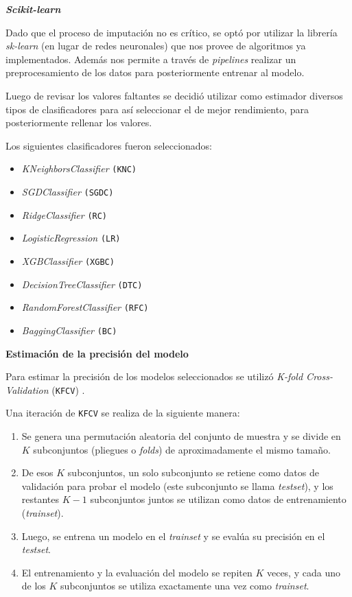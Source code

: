 \documentclass[a4paper,12pt]{article}
\begin{document}
		\clearpage
						
		\textbf{\textit{Scikit-learn}}
						
		Dado que el proceso de imputación no es crítico, se optó por utilizar la librería \textit{sk-learn} (en lugar de redes neuronales) que nos provee de algoritmos ya implementados. Además nos permite a través de \textit{pipelines} realizar un preprocesamiento de los datos para posteriormente entrenar al modelo.
						
		Luego de revisar los valores faltantes se decidió utilizar como estimador diversos tipos de clasificadores para así seleccionar el de mejor rendimiento, para posteriormente rellenar los valores.
						
		Los siguientes clasificadores fueron seleccionados:
						
		\begin{itemize}[noitemsep, topsep=2pt]
			\item \textit{KNeighborsClassifier} \texttt{(KNC)}
			\item \textit{SGDClassifier} \texttt{(SGDC)}
			\item \textit{RidgeClassifier} \texttt{(RC)}
			\item \textit{LogisticRegression} \texttt{(LR)}
			\item \textit{XGBClassifier} \texttt{(XGBC)}
			\item \textit{DecisionTreeClassifier} \texttt{(DTC)}
			\item \textit{RandomForestClassifier} \texttt{(RFC)}
			\item \textit{BaggingClassifier} \texttt{(BC)}
		\end{itemize}
						
		\hfill
						
		\textbf{Estimación de la precisión del modelo}
						
		Para estimar la precisión de los modelos seleccionados se utilizó \textit{K-fold Cross-Validation} (\texttt{KFCV}) \citep{kfolds}.
						
		Una iteración de \texttt{KFCV} se realiza de la siguiente manera: 
						
		\begin{enumerate}[noitemsep, topsep=2pt]
			\item Se genera una permutación aleatoria del conjunto de muestra y se divide en $K$ subconjuntos (pliegues o \textit{folds}) de aproximadamente el mismo tamaño.
			\item De esos $K$ subconjuntos, un solo subconjunto se retiene como datos de validación para probar el modelo (este subconjunto se llama \textit{testset}), y los restantes $K-1$ subconjuntos juntos se utilizan como datos de entrenamiento (\textit{trainset}).
			\item Luego, se entrena un modelo en el \textit{trainset} y se evalúa su precisión en el \textit{testset}. 
			\item El entrenamiento y la evaluación del modelo se repiten $K$ veces, y cada uno de los $K$ subconjuntos se utiliza exactamente una vez como \textit{trainset}.
		\end{enumerate}
						
\end{document}

